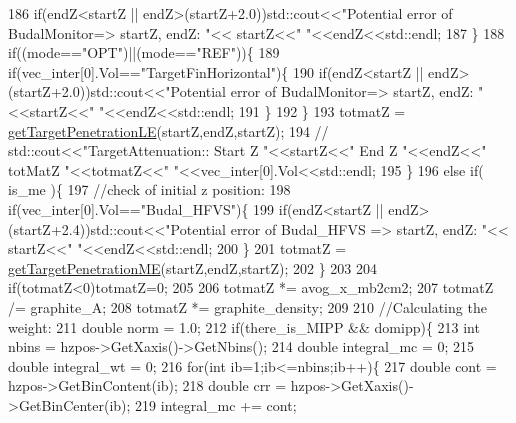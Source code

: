 \begin{DoxyCode}
186         \textcolor{keywordflow}{if}(endZ<startZ || endZ>(startZ+2.0))std::cout<<\textcolor{stringliteral}{"Potential error of BudalMonitor=> startZ, endZ: "}<<
      startZ<<\textcolor{stringliteral}{" "}<<endZ<<std::endl;   
187       \}      
188       \textcolor{keywordflow}{if}((mode==\textcolor{stringliteral}{"OPT"})||(mode==\textcolor{stringliteral}{"REF"}))\{
189         \textcolor{keywordflow}{if}(vec\_inter[0].Vol==\textcolor{stringliteral}{"TargetFinHorizontal"})\{
190           \textcolor{keywordflow}{if}(endZ<startZ || endZ>(startZ+2.0))std::cout<<\textcolor{stringliteral}{"Potential error of BudalMonitor=> startZ, endZ: "}
      <<startZ<<\textcolor{stringliteral}{" "}<<endZ<<std::endl;   
191         \}
192       \}
193       totmatZ = \hyperlink{class_neutrino_flux_reweight_1_1_target_attenuation_reweighter_a456b05db5e17fef740619e47c18eabcf}{getTargetPenetrationLE}(startZ,endZ,startZ);
194      \textcolor{comment}{// std::cout<<"TargetAttenuation:: Start Z "<<startZ<<" End Z "<<endZ<<" totMatZ "<<totmatZ<<"
       "<<vec\_inter[0].Vol<<std::endl;}
195     \}
196     \textcolor{keywordflow}{else} \textcolor{keywordflow}{if}( is\_me )\{ 
197       \textcolor{comment}{//check of initial z position:}
198       \textcolor{keywordflow}{if}(vec\_inter[0].Vol==\textcolor{stringliteral}{"Budal\_HFVS"})\{
199         \textcolor{keywordflow}{if}(endZ<startZ || endZ>(startZ+2.4))std::cout<<\textcolor{stringliteral}{"Potential error of Budal\_HFVS => startZ, endZ: "}<<
      startZ<<\textcolor{stringliteral}{" "}<<endZ<<std::endl;   
200       \}
201       totmatZ = \hyperlink{class_neutrino_flux_reweight_1_1_target_attenuation_reweighter_a69653c6ab68bdf8836d80a302cb818c1}{getTargetPenetrationME}(startZ,endZ,startZ);
202     \}   
203 
204     \textcolor{keywordflow}{if}(totmatZ<0)totmatZ=0;
205     
206     totmatZ *= avog\_x\_mb2cm2;
207     totmatZ /= graphite\_A;
208     totmatZ *= graphite\_density;
209 
210     \textcolor{comment}{//Calculating the weight:}
211     \textcolor{keywordtype}{double} norm = 1.0;
212     \textcolor{keywordflow}{if}(there\_is\_MIPP && domipp)\{
213       \textcolor{keywordtype}{int} nbins = hzpos->GetXaxis()->GetNbins();
214       \textcolor{keywordtype}{double} integral\_mc = 0;
215       \textcolor{keywordtype}{double} integral\_wt = 0;
216       \textcolor{keywordflow}{for}(\textcolor{keywordtype}{int} ib=1;ib<=nbins;ib++)\{
217         \textcolor{keywordtype}{double} cont = hzpos->GetBinContent(ib);
218         \textcolor{keywordtype}{double} crr  = hzpos->GetXaxis()->GetBinCenter(ib);
219         integral\_mc += cont;    

\end{DoxyCode}
